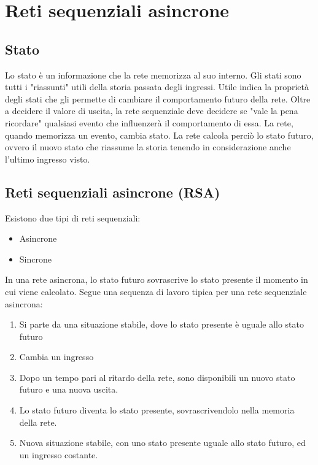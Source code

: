 \documentclass{article}
\begin{document}
\section{Reti sequenziali asincrone}

\subsection{Stato}

Lo stato è un informazione che la rete memorizza al suo interno.
Gli stati sono tutti i "riassunti" utili della storia passata degli ingressi.
Utile indica la proprietà degli stati che gli permette di cambiare il comportamento futuro della rete.
Oltre a decidere il valore di uscita, la rete sequenziale deve decidere se "vale la pena ricordare" qualsiasi evento che influenzerà il comportamento di essa.
La rete, quando memorizza un evento, cambia stato.
La rete calcola perciò lo stato futuro, ovvero il nuovo stato che riassume la storia tenendo in considerazione anche l'ultimo ingresso visto.

\subsection{Reti sequenziali asincrone (RSA)}

Esistono due tipi di reti sequenziali:

\begin{itemize}
    \item Asincrone
    \item Sincrone
\end{itemize}

\noindent
In una rete asincrona, lo stato futuro sovrascrive lo stato presente il momento in cui viene calcolato.
Segue una sequenza di lavoro tipica per una rete sequenziale asincrona:

\begin{enumerate}
    \item Si parte da una situazione stabile, dove lo stato presente è uguale allo stato futuro
    \item Cambia un ingresso
    \item Dopo un tempo pari al ritardo della rete, sono disponibili un nuovo stato futuro e una nuova uscita.
    \item Lo stato futuro diventa lo stato presente, sovrascrivendolo nella memoria della rete.
    \item Nuova situazione stabile, con uno stato presente uguale allo stato futuro, ed un ingresso costante.
\end{enumerate}
\end{document}
